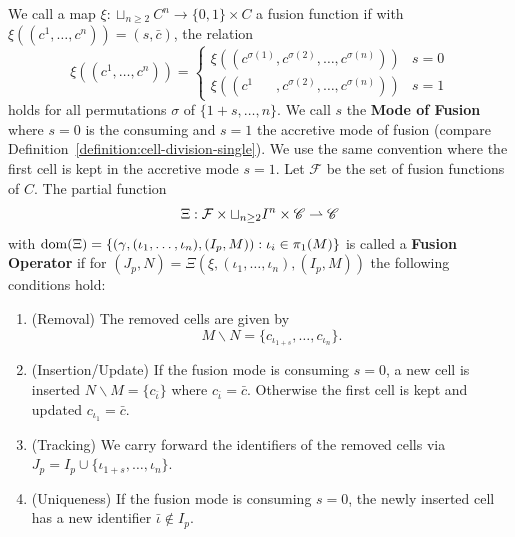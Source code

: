 \begin{definition}
    We call a map $\xi:\sqcup_{n\geq 2}C^n\rightarrow \{0,1\}\times C$ a fusion function if
    with $\xi((c^1,\dots,c^n))=(s,\bar{c})$, the relation
    \begin{equation}
        \xi((c^1,\dots,c^n))=
        \begin{cases}
            \xi((c^{\sigma(1)},c^{\sigma(2)},\dots,c^{\sigma(n)})) &s=0\\
            \xi((c^{1\phantom{\sigma()}},c^{\sigma(2)},\dots,c^{\sigma(n)})) &s=1
        \end{cases}
        \label{eq:definition-cell-fusion-permutation}
    \end{equation}
    holds for all permutations $\sigma$ of $\{1+s,\dots,n\}$.
    We call $s$ the \textbf{Mode of Fusion} where $s=0$ is the consuming and $s=1$ the accretive
    mode of fusion (compare Definition~\ref{definition:cell-division-single}).
    We use the same convention where the first cell is kept in the accretive mode $s=1$.
    Let $\mathcal{F}$ be the set of fusion functions of $C$.
    The partial function
    \begin{equation}
        \Xi:\mathcal{F}\times \sqcup_{n\geq2}I^n\times\mathscr{C}\rightharpoonup\mathscr{C}
    \end{equation}
    with
    $\text{\normalfont dom}(\Xi)=\{(\gamma,(\iota_1,\dots,\iota_n),(I_p,M)):\iota_i\in\pi_1(M)\}$
    is called a \textbf{Fusion Operator} if for $(J_p,N)=\Xi(\xi,(\iota_1,\dots,\iota_n), (I_p,M))$
    the following conditions hold:
    \begin{enumerate}
        \item (Removal) The removed cells are given by
            \begin{equation}
                M\backslash N=\{c_{\iota_{1+s}},\dots,c_{\iota_n}\}.
            \end{equation}
        \item (Insertion/Update) If the fusion mode is consuming $s=0$, a new cell is inserted
            $N\backslash M = \{c_{\bar{\iota}}\}$ where $c_{\bar{\iota}}=\bar{c}$.
            Otherwise the first cell is kept and updated $c_{\iota_1}=\bar{c}$.
        \item (Tracking) We carry forward the identifiers of the removed cells via
            $J_p = I_p \cup \{\iota_{1+s},\dots,\iota_n\}$.
        \item (Uniqueness) If the fusion mode is consuming $s=0$, the newly inserted cell has a new
            identifier $\bar{\iota}\notin I_p$.
    \end{enumerate}
    \label{definition:cell-fusion}
\end{definition}

